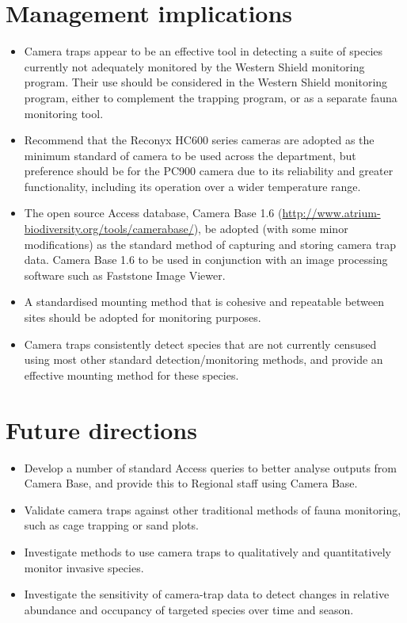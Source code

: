 \documentclass[version=last, paper=a4, DIV=18, usenames, dvipsnames]{scrartcl}
\begin{document}
\section*{Management implications}
\begin{itemize}
\itemsep1pt\parskip0pt
\item
  Camera traps appear to be an effective tool in detecting a suite of
  species currently not adequately monitored by the Western Shield
  monitoring program. Their use should be considered in the Western
  Shield monitoring program, either to complement the trapping program,
  or as a separate fauna monitoring tool.
\item
  Recommend that the Reconyx HC600 series cameras are adopted as the
  minimum standard of camera to be used across the department, but
  preference should be for the PC900 camera due to its reliability and
  greater functionality, including its operation over a wider
  temperature range.
\item
  The open source Access database, Camera Base 1.6
  (\href{http://www.atrium-biodiversity.org/tools/camerabase/}{http://www.atrium-biodiversity.org/tools/camerabase/}),
  be adopted (with some minor modifications) as the standard method of
  capturing and storing camera trap data. Camera Base 1.6 to be used in
  conjunction with an image processing software such as Faststone Image
  Viewer.
\item
  A standardised mounting method that is cohesive and repeatable between
  sites should be adopted for monitoring purposes.
\item
  Camera traps consistently detect species that are not currently
  censused using most other standard detection/monitoring methods, and
  provide an effective mounting method for these species.
\end{itemize}



\section*{Future directions}
\begin{itemize}
\itemsep1pt\parskip0pt
\item
  Develop a number of standard Access queries to better analyse outputs
  from Camera Base, and provide this to Regional staff using Camera
  Base.
\item
  Validate camera traps against other traditional methods of fauna
  monitoring, such as cage trapping or sand plots.
\item
  Investigate methods to use camera traps to qualitatively and
  quantitatively monitor invasive species.
\item
  Investigate the sensitivity of camera-trap data to detect changes in
  relative abundance and occupancy of targeted species over time and
  season.
\end{itemize}




\clearpage
\end{document}
